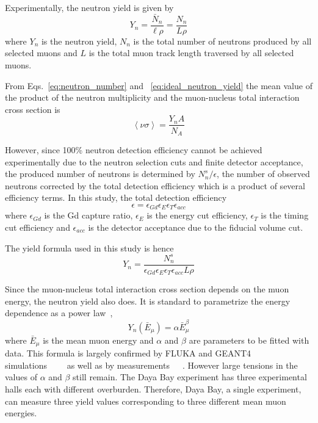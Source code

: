 Experimentally, the neutron yield is given by
\begin{equation} \label{eq:ideal_neutron_yield}
	Y_n=\frac{\bar{N}_n}{\ell\rho}=\frac{N_n}{L\rho}
\end{equation}
where $Y_n$ is the neutron yield, $N_n$ is the total number of neutrons produced by all selected muons and $L$ is the total muon track length traversed by all selected muons.

From Eqs.~\ref{eq:neutron_number} and ~\ref{eq:ideal_neutron_yield} the mean value of the product of the neutron multiplicity and the muon-nucleus total interaction cross section is
\begin{equation}
	\left\langle\nu\sigma\right\rangle=\frac{Y_nA}{N_A}
\end{equation}

However, since 100\% neutron detection efficiency cannot be achieved experimentally due to the neutron selection cuts and finite detector acceptance, the produced number of neutrons is determined by $N_n^s/\epsilon$, the number of observed neutrons corrected by the total detection efficiency which is a product of several efficiency terms. In this study, the total detection efficiency
\begin{equation}
	\epsilon=\epsilon_{Gd}\epsilon_E\epsilon_T\epsilon_{acc}
\end{equation}
where $\epsilon_{Gd}$ is the Gd capture ratio, $\epsilon_E$ is the energy cut efficiency, $\epsilon_T$ is the timing cut efficiency and $\epsilon_{acc}$ is the detector acceptance due to the fiducial volume cut.

The yield formula used in this study is hence
\begin{equation}
	Y_n=\frac{N_n^s}{\epsilon_{Gd}\epsilon_E\epsilon_T\epsilon_{acc}L\rho}
\end{equation}

Since the muon-nucleus total interaction cross section depends on the muon energy, the neutron yield also does. It is standard to parametrize the energy dependence as a power law~\cite{Zatsepin1965},
\begin{equation}
	Y_n(\bar{E}_\mu)=\alpha\bar{E}_\mu^\beta
\end{equation}
where $\bar{E}_\mu$ is the mean muon energy and $\alpha$ and $\beta$ are parameters to be fitted with data. This formula is largely confirmed by FLUKA and GEANT4 simulations~\cite{Wang2001}~\cite{Araujo2005}~\cite{Mei2006}~\cite{Malgin2008} as well as by measurements~\cite{Bezrukov1973}~\cite{Enikeev1987}~\cite{Aglietta1989}. However large tensions in the values of $\alpha$ and $\beta$ still remain. The Daya Bay experiment has three experimental halls each with different overburden. Therefore, Daya Bay, a single experiment, can measure three yield values corresponding to three different mean muon energies.


